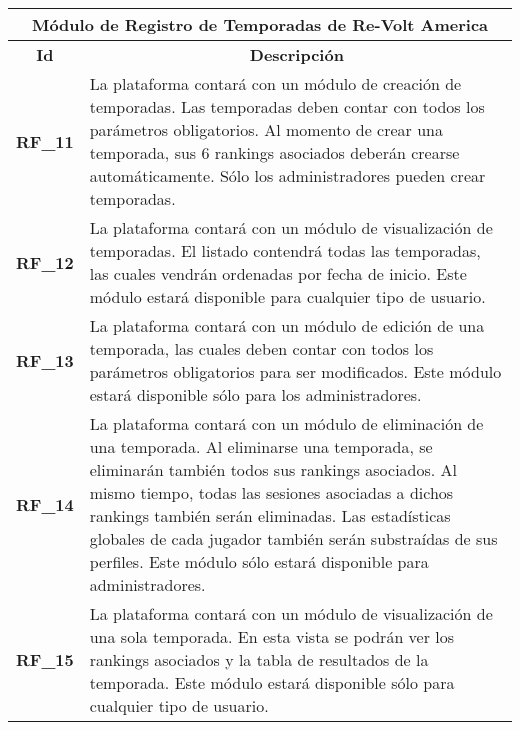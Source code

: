 \begin{center}
	\begin{tabular}{ | l | p{15cm} |}
		\hline
		\multicolumn{2}{|c|}{\textbf{Módulo de Registro de Temporadas de Re-Volt America}} \\
		\hline
		\multicolumn{1}{|c|}{\textbf{Id}} & \multicolumn{1}{|c|}{\textbf{Descripción}} \\
		\hline
		{\textbf{RF\_11}} & La plataforma contará con un módulo de creación de temporadas. Las temporadas deben contar con todos los parámetros obligatorios. Al momento de crear una temporada, sus 6 rankings asociados deberán crearse automáticamente. Sólo los administradores pueden crear temporadas. \\ \hline
		
		{\textbf{RF\_12}} & La plataforma contará con un módulo de visualización de temporadas. El listado contendrá todas las temporadas, las cuales vendrán ordenadas por fecha de inicio. Este módulo estará disponible para cualquier tipo de usuario. \\ \hline
		
		{\textbf{RF\_13}} & La plataforma contará con un módulo de edición de una temporada, las cuales deben contar con todos los parámetros obligatorios para ser modificados. Este módulo estará disponible sólo para los administradores. \\ \hline
		
		{\textbf{RF\_14}} & La plataforma contará con un módulo de eliminación de una temporada. Al eliminarse una temporada, se eliminarán también todos sus rankings asociados. Al mismo tiempo, todas las sesiones asociadas a dichos rankings también serán eliminadas. Las estadísticas globales de cada jugador también serán substraídas de sus perfiles. Este módulo sólo estará disponible para administradores. \\ \hline
		
		{\textbf{RF\_15}} & La plataforma contará con un módulo de visualización de una sola temporada. En esta vista se podrán ver los rankings asociados y la tabla de resultados de la temporada. Este módulo estará disponible sólo para cualquier tipo de usuario.\\ \hline
	\end{tabular}
  
  \label{table:rf:seasons}
\end{center}

